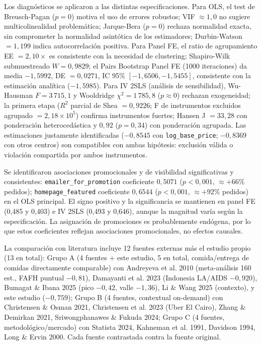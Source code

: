 \documentclass[doc, a4paper, biblatex, floatsintext, longtable, babel]{apa7}
\begin{document}
Los diagnósticos se aplicaron a las distintas especificaciones. Para OLS, el test de Breusch-Pagan ($p=0$) motiva el uso de errores robustos; VIF $ \approx 1,0$ no sugiere multicolinealidad problemática; Jarque-Bera ($p=0$) rechaza normalidad exacta, sin comprometer la normalidad asintótica de los estimadores; Durbin-Watson $=1,199$ indica autocorrelación positiva. Para Panel FE, el ratio de agrupamiento EE $=2,10\times$ es consistente con la necesidad de clustering; Shapiro-Wilk submuestreado $W=0,9829$; el Pairs Bootstrap Panel FE (1000 iteraciones) da media $-1,5992$, DE $=0,0271$, IC 95\% $[-1,6506,-1,5455]$, consistente con la estimación analítica ($-1,5985$). Para IV 2SLS (análisis de sensibilidad), Wu-Hausman $F=3\,715,1$ y Wooldridge $\chi^2=1\,785,8$ ($p \approx0$) rechazan exogeneidad; la primera etapa ($R^2$ parcial de Shea $=0,9226$; F de instrumentos excluidos agrupado $=2,18\times10^5$) confirma instrumentos fuertes; Hansen J $=33,28$ con ponderación heterocedástica y $0,92$ ($p=0,34$) con ponderación agrupada. Las estimaciones justamente identificadas ($-0,8545$ con \texttt{log\_base\_price}; $-0,8369$ con otros centros) son compatibles con ambas hipótesis: exclusión válida o violación compartida por ambos instrumentos.

Se identificaron asociaciones promocionales y de visibilidad significativas y consistentes: \texttt{emailer\_for\_promotion} coeficiente $0,5071$ ($p<0,001$, $ \approx+66\%$ pedidos); \texttt{homepage\_featured} coeficiente $0,6544$ ($p<0,001$, $ \approx+92\%$ pedidos) en el OLS principal. El signo positivo y la significancia se mantienen en panel FE (0,485 y 0,403) e IV 2SLS (0,493 y 0,646), aunque la magnitud varía según la especificación. La asignación de promociones es probablemente endógena, por lo que estos coeficientes reflejan asociaciones promocionales, no efectos causales.

La comparación con literatura incluye 12 fuentes externas más el estudio propio (13 en total): Grupo A (4 fuentes + este estudio, 5 en total, comida/entrega de comidas directamente comparable) con Andreyeva et al. 2010 (meta-análisis 160 est., FAFH puntual $-0,81$), Damayanti et al. 2023 (Indonesia LA/AIDS $-0,920$), Bumagat \& Ibana 2025 (pico $-0,42$, valle $-1,36$), Li \& Wang 2025 (contexto), y este estudio ($-0,759$); Grupo B (4 fuentes, contextual on-demand) con Christensen \& Osman 2021, Christensen et al. 2023 (Uber El Cairo), Zhang \& Demirkan 2021, Sriwongphanawes \& Fukuda 2024; Grupo C (4 fuentes, metodológico/mercado) con Statista 2024, Kahneman et al. 1991, Davidson 1994, Long \& Ervin 2000. Cada fuente contrastada contra la fuente original.
\end{document}
